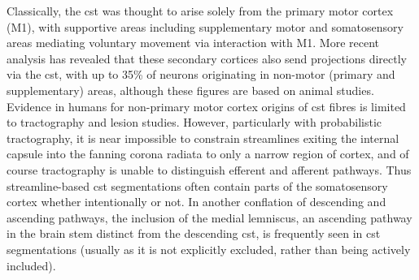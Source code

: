 
Classically, the \gls{cst} was thought to arise solely from the primary motor cortex (M1), with supportive areas including supplementary motor and somatosensory areas mediating voluntary movement via interaction with M1.
More recent analysis has revealed that these secondary cortices also send projections directly via the \gls{cst}\autocite{Kandel2021}, with up to 35\% of neurons originating in non-motor (primary and supplementary) areas, although these figures are based on animal studies\autocite{Welniarz2017}.
Evidence in humans for non-primary motor cortex origins of \gls{cst} fibres is limited to tractography and lesion studies\autocite{Kumar2009,Jane1967}.
However, particularly with probabilistic tractography, it is near impossible to constrain streamlines exiting the internal capsule into the fanning corona radiata to only a narrow region of cortex, and of course tractography is unable to distinguish efferent and afferent pathways.
Thus streamline-based \gls{cst} segmentations often contain parts of the somatosensory cortex whether intentionally or not\autocite{Poulin2022a}.
In another conflation of descending and ascending pathways, the inclusion of the medial lemniscus, an ascending pathway in the brain stem distinct from the descending \gls{cst}, is frequently seen in \gls{cst} segmentations (usually as it is not explicitly excluded, rather than being actively included)\autocite{Wasserthal2018,Warrington2020,Poulin2022a}.

